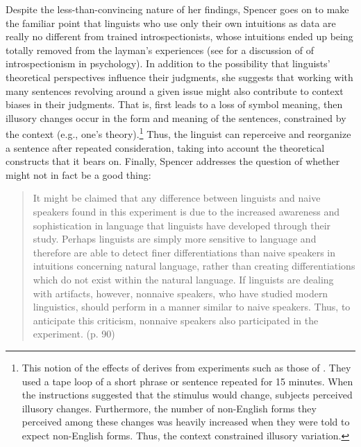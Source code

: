 Despite the less-than-convincing nature of her findings, Spencer goes on to make the familiar point that linguists who use only their own intuitions as data are really no different from trained introspectionists, whose intuitions ended up being totally removed from the layman's experiences (see  for a discussion of  of introspectionism in psychology). In addition to the possibility that linguists' theoretical perspectives influence their judgments, she suggests that working with many sentences revolving around a given issue might also contribute to context biases in their judgments. That is,  first leads to a loss of symbol meaning, then illusory changes occur in the form and meaning of the sentences, constrained by the context (e.g., one's theory).\footnote{This notion of the effects of  derives from experiments such as those of \citet{TaylorEtAl1963}. They used a tape loop of a short phrase or sentence repeated for 15 minutes. When the instructions suggested that the stimulus would change, subjects perceived illusory changes. Furthermore, the number of non-English forms they perceived among these changes was heavily increased when they were told to expect non-English forms. Thus, the context constrained illusory variation.
}
 Thus, the linguist can reperceive and reorganize a sentence after repeated consideration, taking into account the theoretical constructs that it bears on. Finally, Spencer addresses the question of whether  might not in fact be a good thing:

 \largerpage[-2]
 \begin{quote}
It might be claimed that any difference between linguists and naive speakers found in this experiment is due to the increased awareness and sophistication in language that linguists have developed through their study. Perhaps linguists are simply more sensitive to language and therefore are able to detect finer differentiations than naive speakers in intuitions concerning natural language, rather than creating differentiations which do not exist within the natural language. If linguists are dealing with artifacts, however, nonnaive speakers, who have studied modern linguistics, should perform in a manner similar to naive speakers. Thus, to anticipate this criticism, nonnaive speakers also participated in the experiment. (p. 90)
 \end{quote}

